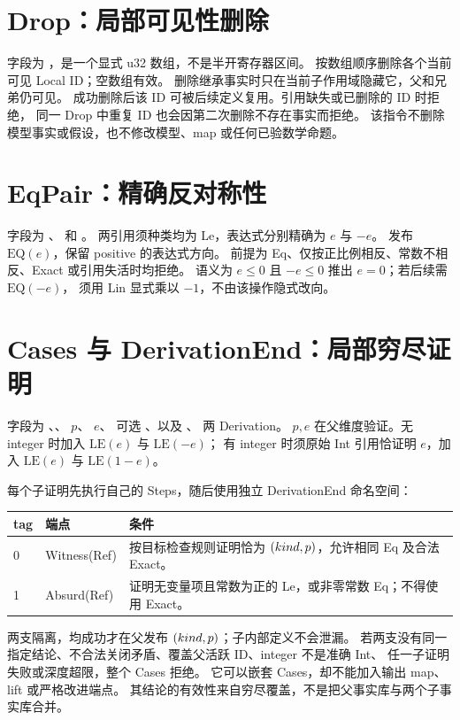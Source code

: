 \section{Drop：局部可见性删除}
\label{ins:drop}

字段为 ，是一个显式 u32 数组，不是半开寄存器区间。
按数组顺序删除各个当前可见 Local ID；空数组有效。
删除继承事实时只在当前子作用域隐藏它，父和兄弟仍可见。
成功删除后该 ID 可被后续定义复用。引用缺失或已删除的 ID 时拒绝，
同一 Drop 中重复 ID 也会因第二次删除不存在事实而拒绝。
该指令不删除模型事实或假设，也不修改模型、map 或任何已验数学命题。

\section{EqPair：精确反对称性}
\label{ins:eq-pair}

字段为 、 和 。
两引用须种类均为 Le，表达式分别精确为 $e$ 与 $-e$。
发布 $\mathrm{EQ}(e)$，保留 positive 的表达式方向。
前提为 Eq、仅按正比例相反、常数不相反、Exact 或引用失活时均拒绝。
语义为 $e\le0$ 且 $-e\le0$ 推出 $e=0$；若后续需 $\mathrm{EQ}(-e)$，
须用 Lin 显式乘以 $-1$，不由该操作隐式改向。

\section{Cases 与 DerivationEnd：局部穷尽证明}
\label{ins:cases}

字段为 、、 $p$、 $e$、
可选 、以及 、 两 Derivation。
$p,e$ 在父维度验证。无 integer 时加入 $\mathrm{LE}(e)$ 与 $\mathrm{LE}(-e)$；
有 integer 时须原始 Int 引用恰证明 $e$，加入 $\mathrm{LE}(e)$ 与 $\mathrm{LE}(1-e)$。

每个子证明先执行自己的 Steps，随后使用独立 DerivationEnd 命名空间：
\begin{center}
\begin{tabularx}{\textwidth}{llY}
\toprule
tag & 端点 & 条件 \\
 & Witness(Ref) & 按目标检查规则证明恰为 $(kind,p)$，允许相同 Eq 及合法 Exact。\\
1 & Absurd(Ref) & 证明无变量项且常数为正的 Le，或非零常数 Eq；不得使用 Exact。\\
\bottomrule
\end{tabularx}
\end{center}

两支隔离，均成功才在父发布 $(kind,p)$；子内部定义不会泄漏。
若两支没有同一指定结论、不合法关闭矛盾、覆盖父活跃 ID、integer 不是准确 Int、
任一子证明失败或深度超限，整个 Cases 拒绝。
它可以嵌套 Cases，却不能加入输出 map、lift 或严格改进端点。
其结论的有效性来自穷尽覆盖，不是把父事实库与两个子事实库合并。

